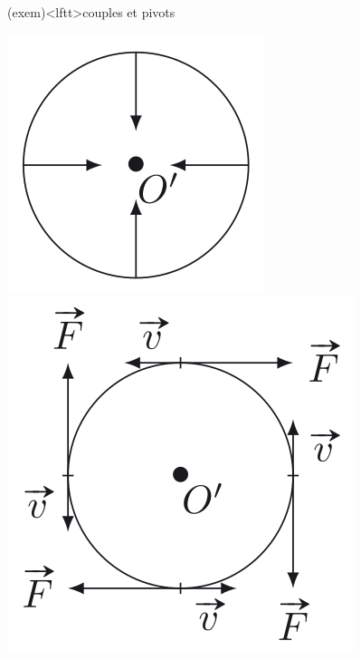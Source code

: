 \documentclass[../../main/main.tex]{subfiles}
\begin{document}
\begin{tcb*}(exem)<lftt>{couples et pivots}
	\begin{isd}
		\begin{isd}
			\includegraphics[width=\linewidth]{couple_nul}
			\captionsetup{justification=centering}
			\tcblower
			\captionsetup{justification=centering}
			\includegraphics[width=\linewidth]{couple_frott}

\end{isd}
\end{isd}
\end{tcb*}
\end{document}
